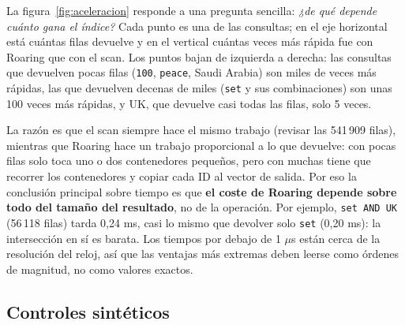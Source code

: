 \documentclass[11pt,a4paper]{article}
\begin{document}
La figura~\ref{fig:aceleracion} responde a una pregunta sencilla: \emph{¿de qué depende cuánto gana el índice?} Cada punto es una de las consultas; en el eje horizontal está cuántas filas devuelve y en el vertical cuántas veces más rápida fue con Roaring que con el scan. Los puntos bajan de izquierda a derecha: las consultas que devuelven pocas filas (\texttt{100}, \texttt{peace}, Saudi Arabia) son miles de veces más rápidas, las que devuelven decenas de miles (\texttt{set} y sus combinaciones) son unas 100 veces más rápidas, y UK, que devuelve casi todas las filas, solo 5 veces.

La razón es que el scan siempre hace el mismo trabajo (revisar las 541\,909 filas), mientras que Roaring hace un trabajo proporcional a lo que devuelve: con pocas filas solo toca uno o dos contenedores pequeños, pero con muchas tiene que recorrer los contenedores y copiar cada ID al vector de salida. Por eso la conclusión principal sobre tiempo es que \textbf{el coste de Roaring depende sobre todo del tamaño del resultado}, no de la operación. Por ejemplo, \texttt{set AND UK} (56\,118 filas) tarda 0,24 ms, casi lo mismo que devolver solo \texttt{set} (0,20 ms): la intersección en sí es barata. Los tiempos por debajo de 1 $\mu$s están cerca de la resolución del reloj, así que las ventajas más extremas deben leerse como órdenes de magnitud, no como valores exactos.

\subsection{Controles sintéticos}
\begin{table}[htbp]
\centering\scriptsize

\caption{Selección de escenarios sintéticos; A/B = contenedores array/bitmap del resultado. Aquí el tiempo no incluye la materialización de IDs.}\label{tab:sinteticos}
\end{table}
\end{document}
